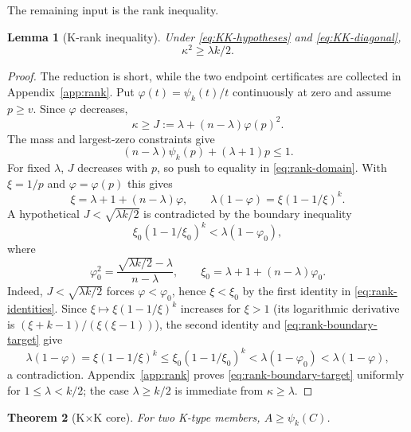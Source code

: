 \documentclass[11pt]{article}
\newtheorem{theorem}{Theorem}[section]
\newtheorem{lemma}[theorem]{Lemma}
\theoremstyle{definition}
\theoremstyle{remark}
\begin{document}
The remaining input is the rank inequality.

\begin{lemma}[K-rank inequality]\label{lem:K-rank}
Under \eqref{eq:KK-hypotheses} and \eqref{eq:KK-diagonal},
\begin{equation}\label{eq:K-rank}
 \kappa^2\ge\lambda k/2.
\end{equation}
\end{lemma}

\begin{proof}
The reduction is short, while the two endpoint certificates are collected in
Appendix~\ref{app:rank}.  Put $\varphi(t)=\psi_k(t)/t$ continuously at
zero and assume $p\ge v$.  Since $\varphi$ decreases,
\[
 \kappa\ge J:=\lambda+(n-\lambda)\varphi(p)^2.
\]
The mass and largest-zero constraints give
\begin{equation}\label{eq:rank-domain}
 (n-\lambda)\psi_k(p)+(\lambda+1)p\le1.
\end{equation}
For fixed $\lambda$, $J$ decreases with $p$, so push to equality in
\eqref{eq:rank-domain}.  With $\xi=1/p$ and $\varphi=\varphi(p)$ this gives
\begin{equation}\label{eq:rank-identities}
 \xi=\lambda+1+(n-\lambda)\varphi,\qquad
 \lambda(1-\varphi)=\xi(1-1/\xi)^k.
\end{equation}
A hypothetical $J<\sqrt{\lambda k/2}$ is contradicted by the boundary
inequality
\begin{equation}\label{eq:rank-boundary-target}
 \xi_0(1-1/\xi_0)^k<\lambda(1-\varphi_0),
\end{equation}
where
\[
 \varphi_0^2=\frac{\sqrt{\lambda k/2}-\lambda}{n-\lambda},\qquad
 \xi_0=\lambda+1+(n-\lambda)\varphi_0.
\]
Indeed, $J<\sqrt{\lambda k/2}$ forces $\varphi<\varphi_0$, hence
$\xi<\xi_0$ by the first identity in \eqref{eq:rank-identities}.  Since
$\xi\mapsto\xi(1-1/\xi)^k$ increases for $\xi>1$ (its logarithmic
derivative is $(\xi+k-1)/(\xi(\xi-1))$), the second identity and
\eqref{eq:rank-boundary-target} give
\[
 \lambda(1-\varphi)=\xi(1-1/\xi)^k\le\xi_0(1-1/\xi_0)^k
 <\lambda(1-\varphi_0)<\lambda(1-\varphi),
\]
a contradiction.
Appendix~\ref{app:rank} proves \eqref{eq:rank-boundary-target} uniformly
for $1\le\lambda<k/2$; the case $\lambda\ge k/2$ is immediate from
$\kappa\ge\lambda$.
\end{proof}

\begin{theorem}[K$\times$K core]\label{thm:KK-core}
For two K-type members, $A\ge\psi_k(C)$.
\end{theorem}
\end{document}
